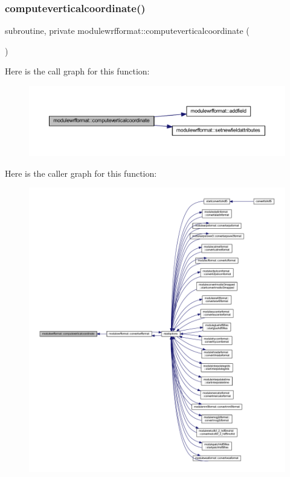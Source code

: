 \subsubsection{\texorpdfstring{computeverticalcoordinate()}{computeverticalcoordinate()}}
{\footnotesize\ttfamily subroutine, private modulewrfformat\+::computeverticalcoordinate (\begin{DoxyParamCaption}{ }\end{DoxyParamCaption})\hspace{0.3cm}{\ttfamily [private]}}

Here is the call graph for this function\+:\nopagebreak
\begin{figure}[H]
\begin{center}
\leavevmode
\includegraphics[width=350pt]{namespacemodulewrfformat_a34fc2d8fa7ad6c853cc7d37d0f31fc9b_cgraph}
\end{center}
\end{figure}
Here is the caller graph for this function\+:\nopagebreak
\begin{figure}[H]
\begin{center}
\leavevmode
\includegraphics[width=350pt]{namespacemodulewrfformat_a34fc2d8fa7ad6c853cc7d37d0f31fc9b_icgraph}
\end{center}
\end{figure}
\mbox{\label{namespacemodulewrfformat_a5ebdc8cdb7d4fca10d2727e8b5b542ce}} 
